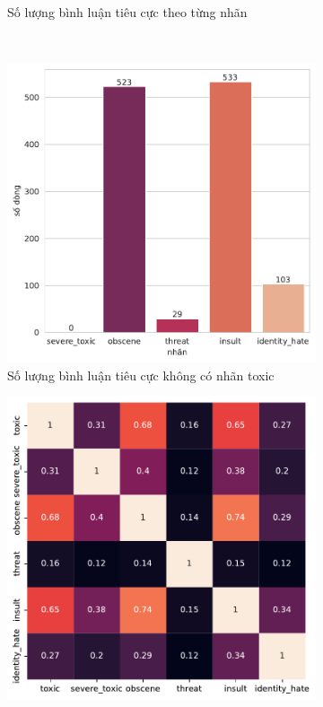 \begin{figure}[htb!]
\begin{subfigure}[t]{0.7\textwidth}
        \caption{Số lượng bình luận tiêu cực theo từng nhãn}
    \end{subfigure}\\
    \begin{subfigure}{0.5\textwidth}
        \centering
        \includegraphics[width=\textwidth]{chapter_2/image/num_records_per_label_without_toxic.pdf}
        \caption{Số lượng bình luận tiêu cực không có nhãn toxic}
    \end{subfigure}%
    \begin{subfigure}{0.5\textwidth}
        \centering
        \includegraphics[width=\textwidth]{chapter_2/image/labels_corr.pdf}

\end{subfigure}
\end{figure}
